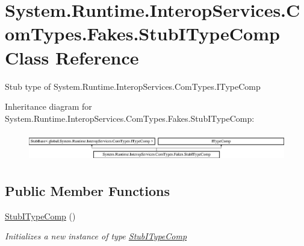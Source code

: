 \hypertarget{class_system_1_1_runtime_1_1_interop_services_1_1_com_types_1_1_fakes_1_1_stub_i_type_comp}{\section{System.\-Runtime.\-Interop\-Services.\-Com\-Types.\-Fakes.\-Stub\-I\-Type\-Comp Class Reference}
\label{class_system_1_1_runtime_1_1_interop_services_1_1_com_types_1_1_fakes_1_1_stub_i_type_comp}
}


Stub type of System.\-Runtime.\-Interop\-Services.\-Com\-Types.\-I\-Type\-Comp 


Inheritance diagram for System.\-Runtime.\-Interop\-Services.\-Com\-Types.\-Fakes.\-Stub\-I\-Type\-Comp\-:\begin{figure}[H]
\begin{center}
\leavevmode
\includegraphics[height=1.255605cm]{class_system_1_1_runtime_1_1_interop_services_1_1_com_types_1_1_fakes_1_1_stub_i_type_comp}
\end{center}
\end{figure}
\subsection*{Public Member Functions}
\begin{DoxyCompactItemize}
\item 
\hyperlink{class_system_1_1_runtime_1_1_interop_services_1_1_com_types_1_1_fakes_1_1_stub_i_type_comp_a53882116a90c2ec66d5559eea93099bd}{Stub\-I\-Type\-Comp} ()
\begin{DoxyCompactList}\small\item\em Initializes a new instance of type \hyperlink{class_system_1_1_runtime_1_1_interop_services_1_1_com_types_1_1_fakes_1_1_stub_i_type_comp}{Stub\-I\-Type\-Comp}\end{DoxyCompactList}\end{DoxyCompactItemize}
